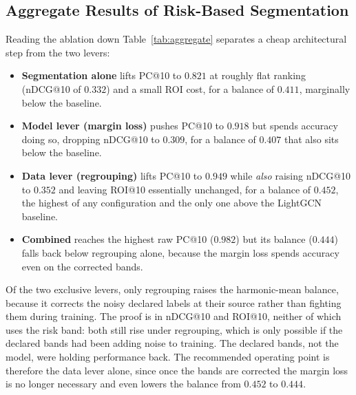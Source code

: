 \subsection{Aggregate Results of Risk-Based Segmentation}
\label{sec:results:aggregate}
Reading the ablation down Table~\ref{tab:aggregate} separates a cheap architectural step from the two levers:
\begin{itemize}
    \item \textbf{Segmentation alone} lifts PC@10 to $0.821$ at roughly flat ranking (nDCG@10 of $0.332$) and a small ROI cost, for a balance of $0.411$, marginally below the baseline.
    \item \textbf{Model lever (margin loss)} pushes PC@10 to $0.918$ but spends accuracy doing so, dropping nDCG@10 to $0.309$, for a balance of $0.407$ that also sits below the baseline.
    \item \textbf{Data lever (regrouping)} lifts PC@10 to $0.949$ while \emph{also} raising nDCG@10 to $0.352$ and leaving ROI@10 essentially unchanged, for a balance of $0.452$, the highest of any configuration and the only one above the LightGCN baseline.
    \item \textbf{Combined} reaches the highest raw PC@10 ($0.982$) but its balance ($0.444$) falls back below regrouping alone, because the margin loss spends accuracy even on the corrected bands.
\end{itemize}
Of the two exclusive levers, only regrouping raises the harmonic-mean balance, because it corrects the noisy declared labels at their source rather than fighting them during training. The proof is in nDCG@10 and ROI@10, neither of which uses the risk band: both still rise under regrouping, which is only possible if the declared bands had been adding noise to training. The declared bands, not the model, were holding performance back. The recommended operating point is therefore the data lever alone, since once the bands are corrected the margin loss is no longer necessary and even lowers the balance from $0.452$ to $0.444$.

